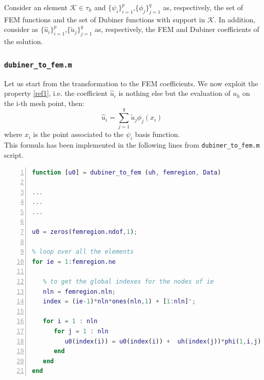 \documentclass[a4paper,11pt]{article}
\begin{document}
	\noindent Consider an element $\mathcal{K}\in \tau_h$ and $\{\psi_{i}\}_{i=1}^{p}$,$\{\phi_{j}\}_{j=1}^{q}$ as, respectively, the set of FEM functions and the set of Dubiner functions with support in $\mathcal{K}$. In addition, consider as $\{\hat{u}_i\}_{i=1}^p$,$\{\tilde{u}_j\}_{j=1}^q$ as, respectively, the FEM and Dubiner coefficients of the solution. \vspace{5mm}
	
	\subsubsection{\texttt{dubiner\_to\_fem.m}}
	\noindent Let us start from the transformation to the FEM coefficients. We now exploit the property \ref{ref1}, i.e. the coefficient $\hat{u}_i$ is nothing else but the evaluation of $u_h$ on the i-th mesh point, then: 
	\begin{equation} \label{ref3}
	\hat{u}_i = \sum_{j=1}^q \tilde{u}_j\phi_j(x_i)
	\end{equation}
	where $x_i$ is the point associated to the $\psi_i$ basis function. \vspace{5mm} \\
	This formula has been implemented in the following lines from \texttt{dubiner\_to\_fem.m} script. \\
	\begin{lstlisting}[language=Matlab,basicstyle=\small, numbers=left, numberstyle=\tiny,  name = dubiner_to_fem.m, frame=single]
function [u0] = dubiner_to_fem (uh, femregion, Data)  
	
...
...
...
	
u0 = zeros(femregion.ndof,1);
	
% loop over all the elements
for ie = 1:femregion.ne
	
   % to get the global indexes for the nodes of ie 
   nln = femregion.nln;
   index = (ie-1)*nln*ones(nln,1) + [1:nln]';
	
   for i = 1 : nln
      for j = 1 : nln
         u0(index(i)) = u0(index(i)) +  uh(index(j))*phi(1,i,j);
      end
   end
end
	\end{lstlisting} \vspace{4mm}
\end{document}
